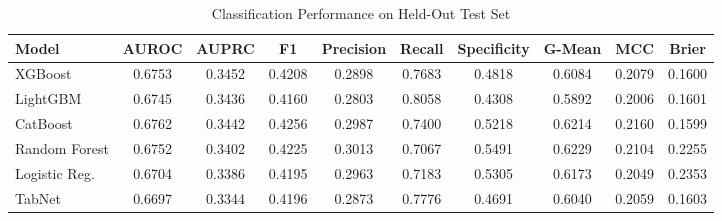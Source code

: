 \begin{table}
\centering
\caption{Classification Performance on Held-Out Test Set}
\label{tab:results}
\begin{tabular}{lccccccccc}
\toprule
Model & AUROC & AUPRC & F1 & Precision & Recall & Specificity & G-Mean & MCC & Brier \\
\midrule
XGBoost & 0.6753 & 0.3452 & 0.4208 & 0.2898 & 0.7683 & 0.4818 & 0.6084 & 0.2079 & 0.1600 \\
LightGBM & 0.6745 & 0.3436 & 0.4160 & 0.2803 & 0.8058 & 0.4308 & 0.5892 & 0.2006 & 0.1601 \\
CatBoost & 0.6762 & 0.3442 & 0.4256 & 0.2987 & 0.7400 & 0.5218 & 0.6214 & 0.2160 & 0.1599 \\
Random Forest & 0.6752 & 0.3402 & 0.4225 & 0.3013 & 0.7067 & 0.5491 & 0.6229 & 0.2104 & 0.2255 \\
Logistic Reg. & 0.6704 & 0.3386 & 0.4195 & 0.2963 & 0.7183 & 0.5305 & 0.6173 & 0.2049 & 0.2353 \\
TabNet & 0.6697 & 0.3344 & 0.4196 & 0.2873 & 0.7776 & 0.4691 & 0.6040 & 0.2059 & 0.1603 \\
\bottomrule
\end{tabular}
\end{table}
